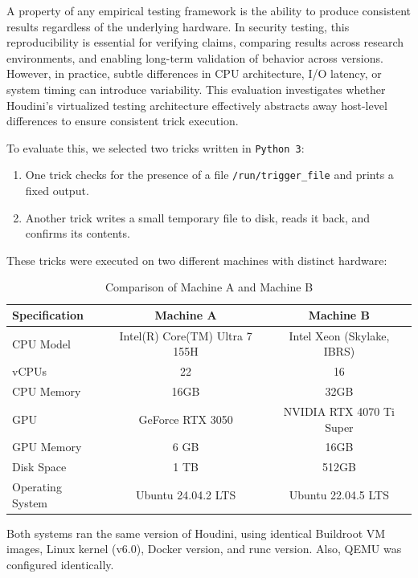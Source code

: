 \documentclass[12pt]{report}
\begin{document}
\begin{doublespace}
A property of any empirical testing framework is the ability to produce consistent results regardless of the underlying hardware. In security testing, this reproducibility is essential for verifying claims, comparing results across research environments, and enabling long-term validation of behavior across versions. However, in practice, subtle differences in CPU architecture, I/O latency, or system timing can introduce variability. This evaluation investigates whether Houdini’s virtualized testing architecture effectively abstracts away host-level differences to ensure consistent trick execution.

To evaluate this, we selected two tricks written in \texttt{Python 3}:

\begin{enumerate}
    \item One trick checks for the presence of a file \texttt{/run/trigger\_file} and prints a fixed output.
    \item Another trick writes a small temporary file to disk, reads it back, and confirms its contents.
\end{enumerate}

These tricks were executed on two different machines with distinct hardware:

\begin{table}[h]
\centering
\caption{Comparison of Machine A and Machine B}
\label{tab:machine-comparison}
\begin{tabular}{|l|c|c|}
\hline
\textbf{Specification} & \textbf{Machine A} & \textbf{Machine B} \\
\hline
CPU Model & Intel(R) Core(TM) Ultra 7 155H & Intel Xeon (Skylake, IBRS) \\
vCPUs & 22 & 16 \\
CPU Memory & 16GB & 32GB \\
GPU & GeForce RTX 3050 & NVIDIA RTX 4070 Ti Super \\
GPU Memory & 6 GB & 16GB \\
Disk Space & 1 TB & 512GB \\
Operating System & Ubuntu 24.04.2 LTS & Ubuntu 22.04.5 LTS \\
\hline
\end{tabular}
\end{table}

Both systems ran the same version of Houdini, using identical Buildroot VM images, Linux kernel (v6.0), Docker version, and runc version. Also, QEMU was configured identically.


\end{doublespace}
\end{document}
